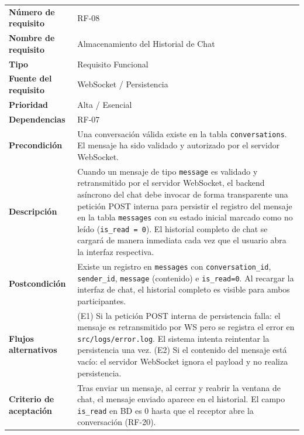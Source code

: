 \documentclass[11pt,a4paper]{report}
\begin{document}
\begin{table}[H]
\centering
\begin{tabularx}{\textwidth}{|l|L|}
\hline
{} \\ \hline
\textbf{Número de requisito} & RF-08 \\ \hline
\textbf{Nombre de requisito} & Almacenamiento del Historial de Chat \\ \hline
\textbf{Tipo} & Requisito Funcional \\ \hline
\textbf{Fuente del requisito} & WebSocket / Persistencia \\ \hline
\textbf{Prioridad} & Alta / Esencial \\ \hline
\textbf{Dependencias} & RF-07 \\ \hline
\textbf{Precondición} & Una conversación válida existe en la tabla \texttt{conversations}. El mensaje ha sido validado y autorizado por el servidor WebSocket. \\ \hline
\textbf{Descripción} & Cuando un mensaje de tipo \texttt{message} es validado y retransmitido por el servidor WebSocket, el backend asíncrono del chat debe invocar de forma transparente una petición POST interna para persistir el registro del mensaje en la tabla \texttt{messages} con su estado inicial marcado como no leído (\texttt{is\_read = 0}). El historial completo de chat se cargará de manera inmediata cada vez que el usuario abra la interfaz respectiva. \\ \hline
\textbf{Postcondición} & Existe un registro en \texttt{messages} con \texttt{conversation\_id}, \texttt{sender\_id}, \texttt{message} (contenido) e \texttt{is\_read=0}. Al recargar la interfaz de chat, el historial completo es visible para ambos participantes. \\ \hline
\textbf{Flujos alternativos} & (E1) Si la petición POST interna de persistencia falla: el mensaje es retransmitido por WS pero se registra el error en \texttt{src/logs/error.log}. El sistema intenta reintentar la persistencia una vez. (E2) Si el contenido del mensaje está vacío: el servidor WebSocket ignora el payload y no realiza persistencia. \\ \hline
\textbf{Criterio de aceptación} & Tras enviar un mensaje, al cerrar y reabrir la ventana de chat, el mensaje enviado aparece en el historial. El campo \texttt{is\_read} en BD es 0 hasta que el receptor abre la conversación (RF-20). \\ \hline
\end{tabularx}
\end{table}
\end{document}
